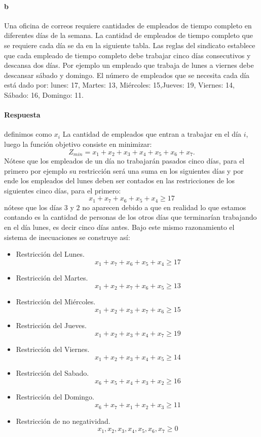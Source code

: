 \documentclass{article}
\begin{document}
	\paragraph{b} Una oficina de correos requiere cantidades de empleados de tiempo completo en diferentes días de la semana. La cantidad de empleados de tiempo completo que se requiere cada día se da en la siguiente tabla. Las reglas del sindicato establece que cada empleado de tiempo completo debe trabajar cinco días consecutivos y descansa dos días. Por ejemplo un empleado que trabaja de lunes a viernes debe descansar sábado y domingo. El número de empleados que se necesita cada día está dado por: lunes: 17, Martes: 13, Miércoles: 15,Jueves: 19, Viernes: 14, Sábado: 16, Domingo: 11.
	\paragraph{Respuesta} definimos como $x_i$ La cantidad de empleados que entran a trabajar en el día $i$, luego la función objetivo consiste en minimizar:
	$$Z_{min} = x_1 + x_2 + x_3 + x_4 + x_5 + x_6 + x_7.$$
	Nótese que los empleados de un día no trabajarán pasados cinco días, para el primero por ejemplo su restricción será una suma en los siguientes días y por ende los empleados del lunes deben ser contados en las restricciones de los siguientes cinco días, para el primero:
	$$x_1 + x_7 + x_6 + x_5 + x_4 \geq 17$$
	nótese que los días $3$ y $2$ no aparecen debido a que en realidad lo que estamos contando es la cantidad de personas de los otros días que terminarían trabajando en el día lunes, es decir cinco días antes. Bajo este mismo razonamiento el sistema de inecuaciones se construye así:
	\begin{itemize}
		\item Restricción del Lunes.
		$$x_1 + x_7 + x_6 + x_5 + x_4 \geq 17$$
		\item Restricción del Martes.
		$$x_1 + x_2 + x_7 + x_6 + x_5 \geq 13$$
		\item Restricción del Miércoles.
		$$x_1 + x_2 + x_3 + x_7 + x_6 \geq 15$$
		\item Restricción del Jueves.
		$$x_1 + x_2 + x_3 + x_4 + x_7 \geq 19$$
		\item Restricción del Viernes.
		$$x_1 + x_2 + x_3 + x_4 + x_5 \geq 14$$
		\item Restricción del Sabado.
		$$x_6 + x_5 + x_4 + x_3 + x_2 \geq 16$$
		\item Restricción del Domingo.
		$$x_6 + x_7 + x_1 + x_2 + x_3 \geq 11$$
		\item Restricción de no negatividad.
		$$x_1, x_2, x_3, x_4, x_5, x_6, x_7 \geq 0$$
	\end{itemize}
\end{document}
